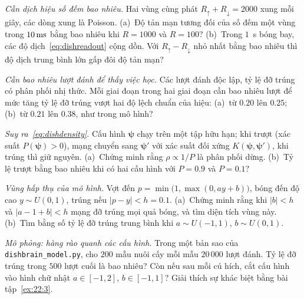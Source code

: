 \begin{exercise}[\lvlA]
\label{ex:22:1}
\emph{Cần dịch hiệu số đếm bao nhiêu.} Hai vùng cùng phát $R_\uparrow+R_\downarrow=2000$ xung mỗi giây, các dòng xung là Poisson. (a)~Độ tản mạn tương đối của số đếm một vùng trong $10\,\text{ms}$ bằng bao nhiêu khi $R=1000$ và $R=100$? (b)~Trong $1$~s bóng bay, các độ dịch~\eqref{eq:dishreadout} cộng dồn. Với $R_\uparrow-R_\downarrow$ nhỏ nhất bằng bao nhiêu thì độ dịch trung bình lớn gấp đôi độ tản mạn?
\end{exercise}

\begin{exercise}[\lvlA]
\label{ex:22:2}
\emph{Cần bao nhiêu lượt đánh để thấy việc học.} Các lượt đánh độc lập, tỷ lệ đỡ trúng có phân phối nhị thức. Mỗi giai đoạn trong hai giai đoạn cần bao nhiêu lượt để mức tăng tỷ lệ đỡ trúng vượt hai độ lệch chuẩn của hiệu: (a)~từ $0.20$ lên $0.25$; (b)~từ $0.21$ lên $0.38$, như trong mô hình?
\end{exercise}

\begin{exercise}[\lvlB]
\label{ex:22:3}
\emph{Suy ra~\eqref{eq:dishdensity}.} Cấu hình $\boldsymbol\psi$ chạy trên một tập hữu hạn; khi trượt (xác suất $P(\boldsymbol\psi)>0$), mạng chuyển sang $\boldsymbol\psi'$ với xác suất đối xứng $K(\boldsymbol\psi,\boldsymbol\psi')$, khi trúng thì giữ nguyên. (a)~Chứng minh rằng $\rho\propto1/P$ là phân phối dừng. (b)~Tỷ lệ trượt bằng bao nhiêu khi có hai cấu hình với $P=0.9$ và $P=0.1$?
\end{exercise}

\begin{exercise}[\lvlB]
\label{ex:22:4}
\emph{Vùng hấp thụ của mô hình.} Vợt đến $p=\min\bigl(1,\max(0,ay+b)\bigr)$, bóng đến độ cao $y\sim U(0,1)$, trúng nếu $|p-y|<h=0.1$. (a)~Chứng minh rằng khi $|b|<h$ và $|a-1+b|<h$ mạng đỡ trúng mọi quả bóng, và tìm diện tích vùng này. (b)~Tìm bằng số tỷ lệ đỡ trúng trung bình khi $a\sim U(-1,1)$, $b\sim U(0,1)$.
\end{exercise}

\begin{exercise}[\lvlB]
\label{ex:22:5}
\emph{Mô phỏng: hàng rào quanh các cấu hình.} Trong một bản sao của \texttt{dishbrain\_model.py}, cho $200$ mẫu nuôi cấy mỗi mẫu $20\,000$ lượt đánh. Tỷ lệ đỡ trúng trong $500$ lượt cuối là bao nhiêu? Còn nếu sau mỗi cú hích, cắt cấu hình vào hình chữ nhật $a\in[-1,2]$, $b\in[-1,1]$? Giải thích sự khác biệt bằng bài tập~\ref{ex:22:3}.
\end{exercise}

